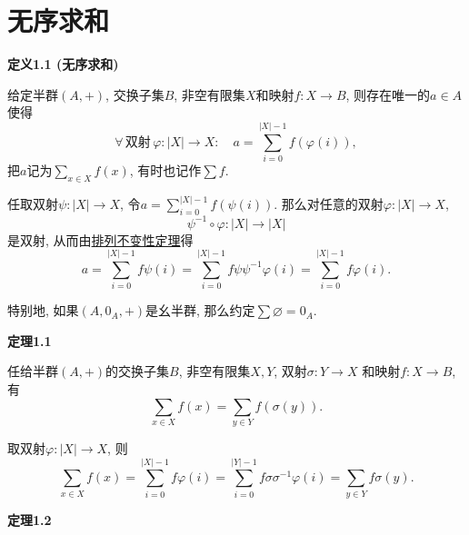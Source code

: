 \documentclass[UTF8]{ctexart}
\begin{document}
\setlength{\abovedisplayskip}{1pt}
\setlength{\belowdisplayskip}{1pt}

\section{无序求和}

\hypertarget{sec:定义1.1}{}
\noindent\textbf{定义1.1 (无序求和)}

给定半群$(A,+)$, 交换子集$B$, 非空有限集$X$和映射$f:X\to B$, 则存在唯一的$a\in A$使得
\vspace{3pt}
\[
    \forall\,\text{双射}\,\varphi:|X|\to X:\quad
    a=\sum_{i=0}^{|X|-1}f(\varphi(i)),
\]
把$a$记为$\displaystyle\sum_{x\in X}f(x)$, 有时也记作$\displaystyle\sum f$.


任取双射$\psi:|X|\to X$, 令$\displaystyle a=\sum_{i=0}^{|X|-1}f(\psi(i))$.
那么对任意的双射$\varphi:|X|\to X$,
\[
    \psi^{-1}\circ\varphi:|X|\to|X|
\]
是双射, 从而由\href{01 有序求和#nameddest=sec:定理2.2}{排列不变性定理}得
\vspace{3pt}
\begin{equation*}
    a=\sum_{i=0}^{|X|-1}f\psi(i)=\sum_{i=0}^{|X|-1}f\psi\psi^{-1}\varphi(i)
    =\sum_{i=0}^{|X|-1}f\varphi(i).
\tag*{\qedsymbol}\end{equation*}

\vspace{13pt}

特别地, 如果$(A,0_A,+)$是幺半群, 那么约定$\displaystyle\sum\varnothing=0_A$.

\vspace{13pt}

\hypertarget{sec:定理1.1}{}
\noindent\textbf{定理1.1}

任给半群$(A,+)$的交换子集$B$, 非空有限集$X,Y$, 双射$\sigma:Y\to X$
和映射$f:X\to B$, 有
\vspace{3pt}
\[
    \sum_{x\in X}f(x)=\sum_{y\in Y}f(\sigma(y)).
\]


取双射$\varphi:|X|\to X$, 则
\begin{equation*}
    \sum_{x\in X}f(x)=\sum_{i=0}^{|X|-1}f\varphi(i)=
    \sum_{i=0}^{|Y|-1}f\sigma\sigma^{-1}\varphi(i)=
    \sum_{y\in Y}f\sigma(y).
\tag*{\qedsymbol}\end{equation*}





\newpage

\hypertarget{sec:定理1.2}{}
\noindent\textbf{定理1.2}
\end{document}
